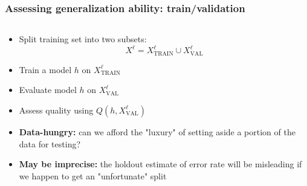 \documentclass[usenames,dvipsnames,aspectratio=169]{beamer}
\begin{document}
\begin{frame}
\frametitle{Assessing generalization ability: train/validation}

\begin{columns}
\begin{column}{0.6\textwidth}
    
\begin{itemize}
  \item Split training set into two subsets:
  \[
  X^{\ell} = X^{\ell}_{\text{TRAIN}} \cup X^{\ell}_{\text{VAL}}
  \]

  \pause
  \item Train a model $h$ on $X^{\ell}_{\text{TRAIN}}$
    
  \pause
  \item Evaluate model $h$ on $X^{\ell}_{\text{VAL}}$

  \pause
  \item Assess quality using $Q(h, X^{\ell}_{\text{VAL}})$

  \pause
  \item \textcolor{BrickRed}{\textbf{Data-hungry:}} 
  can we afford the
  "luxury" of setting aside a portion of the data for testing?

\pause
  \item \textcolor{BrickRed}{\textbf{May be imprecise:}}
  the holdout estimate of error rate will be misleading
  if we happen to get an "unfortunate" split

\end{itemize}
\end{column}

\end{columns}

\end{frame}
\end{document}
